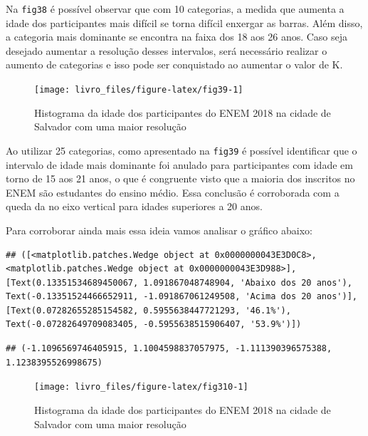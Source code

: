 \documentclass[
]{book}
\begin{document}
Na \texttt{fig38} é possível observar que com 10 categorias, a medida que aumenta a idade dos participantes mais difícil se torna difícil enxergar as barras. Além disso, a categoria mais dominante se encontra na faixa dos 18 aos 26 anos. Caso seja desejado aumentar a resolução desses intervalos, será necessário realizar o aumento de categorias e isso pode ser conquistado ao aumentar o valor de K.

\begin{figure}

{\centering \texttt{[image: livro\_files/figure-latex/fig39-1]} 

}

\caption{Histograma da idade dos participantes do ENEM 2018 na cidade de Salvador com uma maior resolução}\label{fig:fig39}
\end{figure}

Ao utilizar 25 categorias, como apresentado na \texttt{fig39} é possível identificar que o intervalo de idade mais dominante foi anulado para participantes com idade em torno de 15 aos 21 anos, o que é congruente visto que a maioria dos inscritos no ENEM são estudantes do ensino médio. Essa conclusão é corroborada com a queda da no eixo vertical para idades superiores a 20 anos.

Para corroborar ainda mais essa ideia vamos analisar o gráfico abaixo:

\begin{verbatim}
## ([<matplotlib.patches.Wedge object at 0x0000000043E3D0C8>, <matplotlib.patches.Wedge object at 0x0000000043E3D988>], [Text(0.13351534689450067, 1.091867048748904, 'Abaixo dos 20 anos'), Text(-0.13351524466652911, -1.091867061249508, 'Acima dos 20 anos')], [Text(0.07282655285154582, 0.5955638447721293, '46.1%'), Text(-0.07282649709083405, -0.5955638515906407, '53.9%')])
\end{verbatim}

\begin{verbatim}
## (-1.1096569746405915, 1.1004598837057975, -1.111390396575388, 1.1238395526998675)
\end{verbatim}

\begin{figure}

{\centering \texttt{[image: livro\_files/figure-latex/fig310-1]} 

}

\caption{Histograma da idade dos participantes do ENEM 2018 na cidade de Salvador com uma maior resolução}\label{fig:fig310}
\end{figure}
\end{document}
